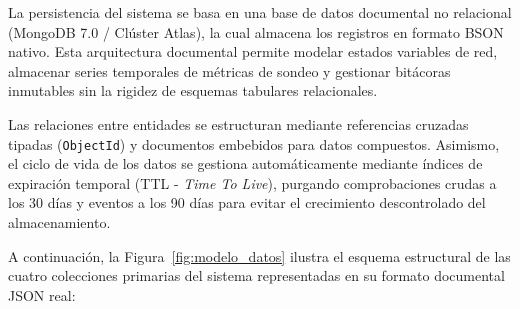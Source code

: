\documentclass[12pt,a4paper]{report}
\begin{document}
La persistencia del sistema se basa en una base de datos documental no relacional (MongoDB 7.0 / Clúster Atlas), la cual almacena los registros en formato BSON nativo. Esta arquitectura documental permite modelar estados variables de red, almacenar series temporales de métricas de sondeo y gestionar bitácoras inmutables sin la rigidez de esquemas tabulares relacionales.

Las relaciones entre entidades se estructuran mediante referencias cruzadas tipadas (\texttt{ObjectId}) y documentos embebidos para datos compuestos. Asimismo, el ciclo de vida de los datos se gestiona automáticamente mediante índices de expiración temporal (TTL - \textit{Time To Live}), purgando comprobaciones crudas a los 30 días y eventos a los 90 días para evitar el crecimiento descontrolado del almacenamiento.

A continuación, la Figura~\ref{fig:modelo_datos} ilustra el esquema estructural de las cuatro colecciones primarias del sistema representadas en su formato documental JSON real:
\end{document}
